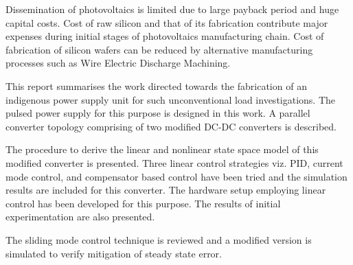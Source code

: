 \begin{Abstract}

Dissemination of photovoltaics is limited due to large payback period and huge capital costs. Cost of raw silicon and that of its fabrication contribute major expenses during initial stages of photovoltaics manufacturing chain. Cost of fabrication of silicon wafers can be reduced by alternative manufacturing processes such as Wire Electric Discharge Machining.

This report summarises the work directed towards the fabrication of an indigenous power supply unit for such unconventional load investigations. The pulsed power supply for this purpose is designed in this work. A parallel converter topology comprising of two modified DC-DC converters is described.

The procedure to derive the linear and nonlinear state space model of this modified converter is presented. Three linear control strategies viz. PID, current mode control, and compensator based control have been tried and the simulation results are included for this converter. The hardware setup employing linear control has been developed for this purpose. The results of initial experimentation are also presented.

The sliding mode control technique is reviewed and a modified version is simulated to verify mitigation of steady state error.
\end{Abstract}